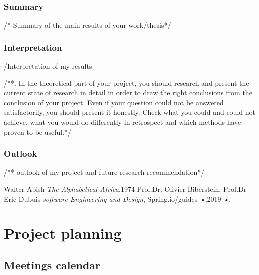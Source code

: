 \documentclass{scrartcl}
\begin{document}
\subsubsection{Summary}
/* Summary of the main results of your work/thesis*/

\subsubsection{Interpretation }
/Interpretation of my results

/**. In the theoretical part of your project, you should research and present the current state of research in detail in order to draw the right conclusions from the conclusion of your project. Even if your question could not be answered satisfactorily, you should present it honestly. Check what you could and could not achieve, what you would do differently in retrospect and which methods have proven to be useful.*/

\subsubsection{Outlook}
/** outlook of my project and future research recommendation*/






\printbibliography[heading=bibintoc]


\begin{thebibliography}{books}
Walter Abish \emph{The Alphabetical Africa},1974
 Prof.Dr. Olivier Biberstein, Prof.Dr Eric Dubuis \emph{software Engineering and Design},
Spring.io/guides \emph{•},2019
 \emph{•},
\end{thebibliography}


\section{Project planning}
\subsection{Meetings calendar}
\end{document}
